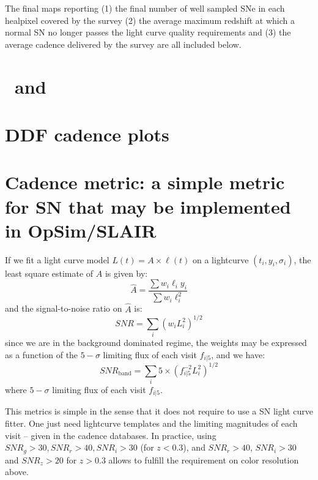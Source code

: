 \begin{appendices}
  The final maps reporting (1) the final number of well sampled SNe in
  each healpixel covered by the survey (2) the average maximum
  redshift at which a normal SN no longer passes the light curve
  quality requirements and (3) the average cadence delivered by the
  survey are all included below.



  
\clearpage

\section{\opsim~and \altsched}
\label{sec:opsim_altsched}



\clearpage

\section{DDF cadence plots}



\clearpage

\section{Cadence metric: a simple metric for SN that may be implemented in OpSim/SLAIR}
\label{sec:cadencemetric}

If we fit a light curve model $L(t) = A \times \ell(t)$ on a
lightcurve $(t_i, y_i, \sigma_i)$, the least square estimate of $A$ is
given by:
$$
\hat{A} = \frac{\sum w_i \ell_i y_i}{\sum w_i \ell_i^2}
$$
and the signal-to-noise ratio on $\hat{A}$ is:
$$
SNR = \sum_i (w_i L_i^2)^{1/2}
$$ since we are in the background dominated regime, the weights may be
expressed as a function of the $5-\sigma$ limiting flux of each visit
$f_{i|5}$, and we have:
$$
SNR_{\mathrm{band}} = \sum_{i} 5 \times (f^{-2}_{i|5} L_i^2)^{1/2}
$$
where $5-\sigma$ limiting flux of each visit $f_{i|5}$.

This metrics is simple in the sense that it does not require to use a SN
light curve fitter. One just need lightcurve templates and the
limiting magnitudes of each visit -- given in the cadence
databases. In practice, using $SNR_g > 30, SNR_r > 40, SNR_i > 30$
(for $z<0.3$), and $SNR_r > 40$, $SNR_i > 30$ and $SNR_z > 20$ for
$z>0.3$ allows to fulfill the requirement on color resolution above.


\end{appendices}
